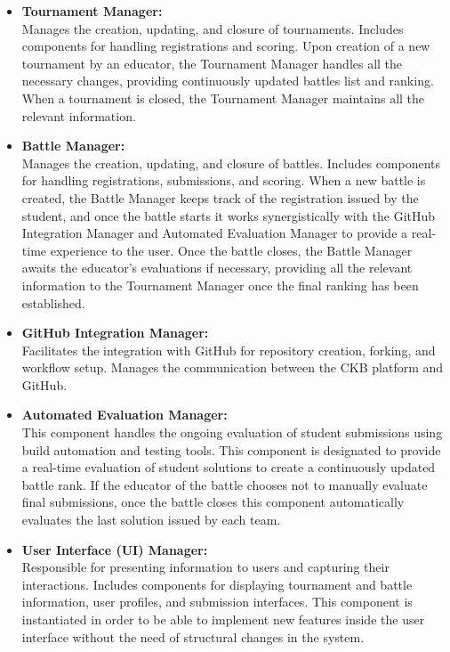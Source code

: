 \begin{itemize}
    \item \textbf{Tournament Manager:}  \\
    Manages the creation, updating, and closure of tournaments. Includes components for handling registrations and scoring. Upon creation of a new tournament by an educator, the Tournament Manager handles all the necessary changes, providing continuously updated battles list and ranking. When a tournament is closed, the Tournament Manager maintains all the relevant information.

    \newpage

    \item \textbf{Battle Manager:}  \\
    Manages the creation, updating, and closure of battles.
    Includes components for handling registrations, submissions, and scoring.
    When a new battle is created, the Battle Manager keeps track of the registration issued by the student, and once the battle starts it works synergistically with the GitHub Integration Manager and Automated Evaluation Manager to provide a real-time experience to the user. Once the battle closes, the Battle Manager awaits the educator's evaluations if necessary, providing all the relevant information to the Tournament Manager once the final ranking has been established.

    \item \textbf{GitHub Integration Manager:} \\
    Facilitates the integration with GitHub for repository creation, forking, and workflow setup.
    Manages the communication between the CKB platform and GitHub.

    \item \textbf{Automated Evaluation Manager:}\\
    This component handles the ongoing evaluation of student submissions using build automation and testing tools. This component is designated to provide a real-time evaluation of student solutions to create a continuously updated battle rank. If the educator of the battle chooses not to manually evaluate final submissions, once the battle closes this component automatically evaluates the last solution issued by each team.

    \item \textbf{User Interface (UI) Manager:} \\
    Responsible for presenting information to users and capturing their interactions. Includes components for displaying tournament and battle information, user profiles, and submission interfaces. This component is instantiated in order to be able to implement new features inside the user interface without the need of structural changes in the system. 


\end{itemize}
